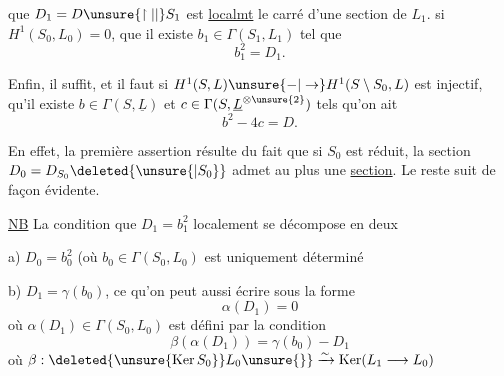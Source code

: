 
que $D_1=D\unsure{\upharpoonright|\vert}S_1$  est \uline{localmt} le carré d'une section de $L_1$.  si $H^1(S_0,L_0)=0$,  que  il existe $b_1\in\Gamma(S_1,L_1)$ tel que
\[b_1^2=D_1.\]

Enfin, il suffit, et il faut si $H^1(S,L)\unsure{-|\to}H^1(S\setminus S_0,L)$ est injectif, qu'il existe $b\in\Gamma(S,\underline L)$ et $c\in\Gamma(S,\underline L^{\otimes\unsure{2}})$ tels qu'on ait
\[b^2-4c=D.\]

En effet, la première assertion résulte du fait que si $S_0$ est réduit, la section $D_0=D_{S_0}\deleted{\unsure{|S_0}}$ admet au plus une \uline{section}. Le reste suit de façon évidente.

\uline{NB} La condition que $D_1=b_1^2$ localement se décompose en deux

a) $D_0=b_0^2$ (où $b_0\in\Gamma(S_0,L_0)$ est uniquement déterminé 

b) $D_1=\gamma(b_0)$, ce qu'on peut aussi écrire sous la forme
\[\alpha(D_1)=0\]
où $\alpha(D_1)\in\Gamma(S_0,L_0)$ est défini par la condition
\[\beta(\alpha(D_1))=\gamma(b_0)-D_1\]
où $\beta:\deleted{\unsure{\operatorname{Ker} S_0}}L_0\unsure{\}}\xrightarrow{\sim}\operatorname{Ker}(L_1\longrightarrow L_0)$
